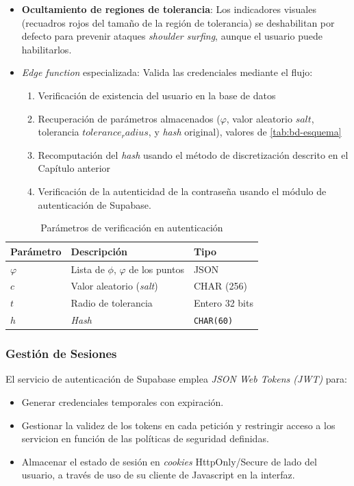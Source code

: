 \begin{itemize}
	\item \textbf{Ocultamiento de regiones de tolerancia}: Los indicadores visuales (recuadros rojos del tama\~no de la regi\'on de tolerancia) se deshabilitan por defecto para prevenir ataques \textit{shoulder surfing}, aunque el usuario puede habilitarlos.
	\item \textit{Edge function} especializada: Valida las credenciales mediante el flujo:
	\begin{enumerate}
		\item Verificación de existencia del usuario en la base de datos
		\item Recuperación de parámetros almacenados ($\varphi$, valor aleatorio $salt$, tolerancia $tolerance_radius$, y \textit{hash} original), valores de \ref{tab:bd-esquema}
		\item Recomputación del \textit{hash} usando el método de discretización descrito en el Capítulo anterior
		\item Verificaci\'on de la autenticidad de la contrase\~na usando el m\'odulo de autenticaci\'on de Supabase.
	\end{enumerate}
\end{itemize}

\begin{table}[ht]
	\centering
	\caption{Parámetros de verificación en autenticación}
	\label{tab:parametros-verificacion}
	\begin{tabularx}{\textwidth}{lXl}
		\toprule
		\textbf{Parámetro} & \textbf{Descripción} & \textbf{Tipo} \\
		\midrule
		$\varphi$ & Lista de $\phi$, $\varphi$ de los puntos & JSON \\
		$c$ & Valor aleatorio  (\textit{salt}) & CHAR (256) \\
		$t$ & Radio de tolerancia & Entero 32 bits \\
		$h$ & \textit{Hash} & \texttt{CHAR(60)} \\
		\bottomrule
	\end{tabularx}
\end{table}

\subsubsection{Gestión de Sesiones}
El servicio de autenticación de Supabase emplea \textit{JSON Web Tokens (JWT)} para:

\begin{itemize}
	\item Generar credenciales temporales con expiración.
	\item Gestionar la validez de los tokens en cada petici\'on y restringir acceso a los servicion en funci\'on de las pol\'iticas de seguridad definidas.
	\item Almacenar el estado de sesión en \textit{cookies} HttpOnly/Secure de lado del usuario, a trav\'es de uso de su cliente de Javascript en la interfaz.
\end{itemize}

